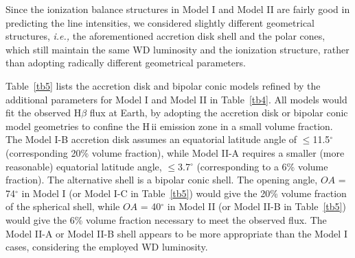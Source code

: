 \documentclass[a4paper,fleqn,usenatbib,useAMS]{mnras}
\def\ie{{\it i.e.,} }
\def\hb{H{$\beta$}}
\def\hii{H\,{\sc ii}}
\begin{document}
{Since the ionization balance structures in Model I and Model II are fairly good in predicting the line intensities, we considered slightly different geometrical structures, \ie the aforementioned accretion disk shell and the polar cones,  which still maintain the same WD luminosity and the ionization structure, rather than adopting radically different geometrical parameters.

Table~\ref{tb5} lists the accretion disk and bipolar conic models refined by the additional parameters for Model I and Model II in Table~\ref{tb4}. All models would fit the observed {\hb} flux at Earth, by adopting the accretion disk or bipolar conic model geometries to confine the {\hii} emission zone in a small volume fraction. The Model I-B accretion disk   assumes an equatorial latitude angle of $\leq$11.5$^{\circ}$ (corresponding 20\% volume fraction), while  Model II-A requires a smaller (more reasonable) equatorial latitude angle, $\leq$3.7$^{\circ}$ (corresponding to a 6\% volume fraction). The alternative shell is a bipolar conic shell. The  opening angle, $OA$ = 74$^{\circ}$ in Model I (or Model I-C in Table~\ref{tb5}) would give the 20\% volume fraction of the spherical shell, while $OA$ = 40$^{\circ}$ in Model II (or Model II-B in Table~\ref{tb5}) would give the  6\% volume fraction necessary to meet the observed flux.
The Model II-A or Model II-B shell appears to be more appropriate than the Model I cases, considering the employed WD luminosity.


\begin{table*}
\caption{Accretion and bipolar models.
See Table~\ref{tb4} for additional parameters.
$^a$The latitude angle range from a torus shape accretion shell model and a bipolar cone model.
$^b$The corresponding volume fraction relative to the spherical shell.
$^c$Opening angle of the bipolar cones, to adjust the model volume fraction to fit the observed flux.
$^d$The separation from the WD to L1 (for M3 III GS ($\sim$6~M$_\odot$) and WD ($\sim$1.4 M$_\odot$) to check the {\hii} accretion disk radius (in Model I-B and Model II-A). The radius of the shell is a distance from the WD, so the dimension (or diameter) of the rotating accretion disk (Fig.~\ref{fig4}) or the expanding bipolar cones (Fig.~\ref{fig7}) would be double the radius. }
\vspace{-0.5cm}
\begin{tabular}{llccc}\\
\hline \hline


\end{tabular}
\end{table*}}
\end{document}
